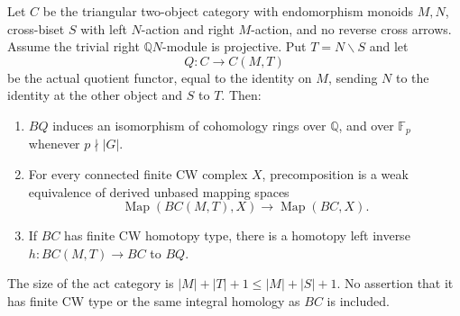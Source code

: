 \begin{theorem}
\label{C:finite-target-opposite-corner}
Let $C$ be the triangular two-object category with endomorphism
monoids $M,N$, cross-biset $S$ with left $N$-action and right
$M$-action, and no reverse cross arrows.
Assume the trivial right $\mathbb QN$-module is projective.
Put $T=N\backslash S$ and let
\[
 Q:C\longrightarrow C(M,T)
\]
be the actual quotient functor, equal to the identity on $M$,
sending $N$ to the identity at the other object and $S$ to $T$.
Then:
\begin{enumerate}
\item $BQ$ induces an isomorphism of cohomology rings over
$\mathbb Q$, and over $\mathbb F_p$ whenever $p\nmid|G|$.
\item For every connected finite CW complex $X$, precomposition is
a weak equivalence of derived unbased mapping spaces
\[
 \operatorname{Map}(BC(M,T),X)
       \longrightarrow \operatorname{Map}(BC,X).
\]
\item If $BC$ has finite CW homotopy type, there is a homotopy
left inverse $h:BC(M,T)\to BC$ to $BQ$.
\end{enumerate}
The size of the act category is $|M|+|T|+1\leq|M|+|S|+1$.
No assertion that it has finite CW type or the same integral
homology as $BC$ is included.
\end{theorem}
